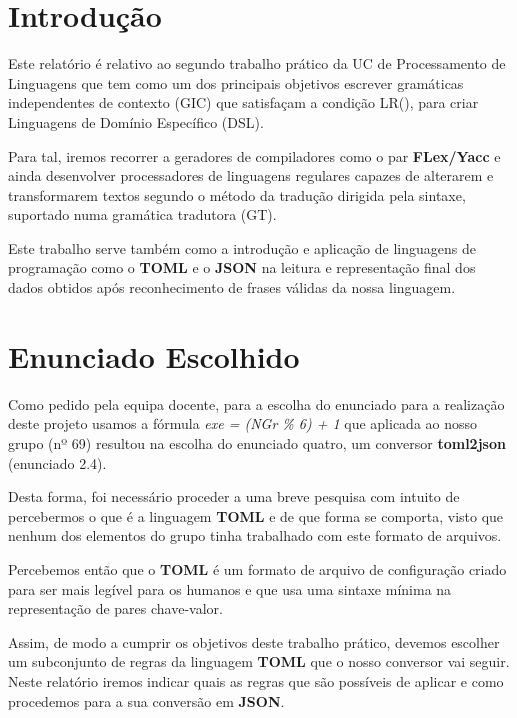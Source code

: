 \documentclass[a4paper,12pt]{report}
\begin{document}

\tableofcontents
\clearpage


\chapter{Introdução}

Este relatório é relativo ao segundo trabalho prático da UC de Processamento de Linguagens que tem como um dos principais objetivos escrever gramáticas independentes de contexto (GIC) que satisfaçam a condição LR(), para criar Linguagens de Domínio Específico (DSL).
\par
Para tal, iremos recorrer a geradores de compiladores como o par \textbf{FLex/Yacc} e ainda desenvolver processadores de linguagens regulares capazes de alterarem e transformarem textos segundo o método da tradução dirigida pela sintaxe, suportado numa gramática tradutora (GT).
\par
Este trabalho serve também como a introdução e aplicação de linguagens de programação como o \textbf{TOML} e o \textbf{JSON} na leitura e representação final dos dados obtidos após reconhecimento de frases válidas da nossa linguagem.

\chapter{Enunciado Escolhido}

Como pedido pela equipa docente, para a escolha do enunciado para a realização deste projeto usamos a fórmula \textit{exe = (NGr \% 6) + 1} que aplicada ao nosso grupo (nº 69) resultou na escolha do enunciado quatro, um conversor \textbf{toml2json} (enunciado 2.4).
\par Desta forma, foi necessário proceder a uma breve pesquisa com intuito de percebermos o que é a linguagem \textbf{TOML} e de que forma se comporta, visto que nenhum dos elementos do grupo tinha trabalhado com este formato de arquivos. 
\par Percebemos então que o \textbf{TOML} é um formato de arquivo de configuração criado para ser mais legível para os humanos e que usa uma sintaxe mínima na representação de pares chave-valor.

\vspace{0.3cm}

\par Assim, de modo a cumprir os objetivos deste trabalho prático, devemos escolher um subconjunto de regras da linguagem \textbf{TOML} que o nosso conversor vai seguir. Neste relatório iremos indicar quais as regras que são possíveis de aplicar e como procedemos para a sua conversão em \textbf{JSON}.
\end{document}
